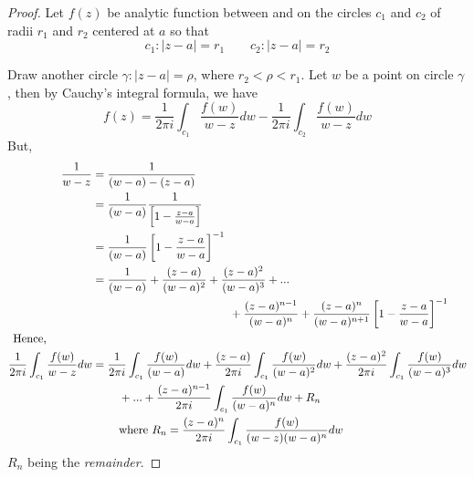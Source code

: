\begin{proof}
Let $f(z)$ be analytic function between and on the circles $c_1$ and $c_2$ of radii $r_1$ and $r_2$ centered at $a$ so that
\[c_1: |z-a|=r_1~~~~~~~~~c_2:|z-a|=r_2\]

Draw another circle $\gamma : |z-a|=\rho $, where $r_2 < \rho < r_1$. Let $w$ be a point on circle $\gamma$, then by Cauchy's integral formula, we have
\begin{equation}\label{Laurent1}
	f(z) = \frac{1}{2\pi i} \int_{c_1} \frac{f(w)}{w-z}dw - \frac{1}{2\pi i} \int_{c_2} \frac{f(w)}{w-z}dw 
\end{equation}
But,
\begin{align*}
	\frac{1}{w-z} &= \frac{1}{(w-a)-(z-a)} \\
								&= \frac{1}{(w-a)}\frac{1}{\left[{1-\frac{z-a}{w-a}}\right]} \\
								&= \frac{1}{(w-a)}\left[{1-\frac{z-a}{w-a}}\right]^{-1} \\
								&= \frac{1}{(w-a)}+ \frac{(z-a)}{(w-a)^2}+ \frac{(z-a)^2}{(w-a)^3} + ... \\
								&~~~~~~~~~~~~~~~~~~~~~~~~~~~~~~~~~~~~+ \frac{(z-a)^{n-1}}{(w-a)^n} + \frac{(z-a)^n}{(w-a)^{n+1}}  \left[{1-\frac{z-a}{w-a}}\right]^{-1}\\
\text{Hence,~~~~~~~~~~~~} \\
					\frac{1}{2\pi i}\int_{c_1} \frac{f(w)}{w-z}dw	&= \frac{1}{2\pi i}\int_{c_1} \frac{f(w)}{(w-a)}dw+ \frac{(z-a)}{2\pi i}\int_{c_1}\frac{f(w)}{(w-a)^2}dw+ \frac{(z-a)^2 }{2\pi i}\int_{c_1}\frac{f(w)}{(w-a)^3} dw \\
					& ~~~~~~~+ ... + \frac{(z-a)^{n-1}}{2\pi i}\int_{c_1} \frac{f(w)}{(w-a)^n}dw + R_n\\
					&~~~~~~~\text{where $\displaystyle R_n= \frac{(z-a)^n}{2\pi i} \int_{c_1} \frac{f(w)}{(w-z)(w-a)^n}dw$} 
\end{align*}
$R_n$ being the \textit{remainder}.


\end{proof}
